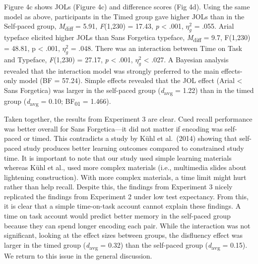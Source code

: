 \documentclass[
  english,
  jou]{apa7}
\begin{document}
Figure 4c shows JOLs (Figure 4c) and difference scores (Fig 4d). Using the same model as above, participants in the Timed group gave higher JOLs than in the Self-paced group, \emph{M}\textsubscript{diff} = 5.91, \emph{F}(1,230) = 17.43, \emph{p} \textless{} .001, \(\eta_{g}^{2}\) = .055. Arial typeface elicited higher JOLs than Sans Forgetica typeface, \emph{M}\textsubscript{diff} = 9.7, F(1,230) = 48.81, p \textless{} .001, \(\eta_{g}^{2}\) = .048. There was an interaction between Time on Task and Typeface, \emph{F}(1,230) = 27.17, \emph{p} \textless{} .001, \(\eta_{g}^{2}\) \textless{} .027. A Bayesian analysis revealed that the interaction model was strongly preferred to the main effects-only model (BF = 57.24). Simple effects revealed that the JOL effect (Arial \textless{} Sans Forgetica) was larger in the self-paced group (\emph{d}\textsubscript{avg} = 1.22) than in the timed group (\emph{d}\textsubscript{avg} = 0.10; BF\textsubscript{01} = 1.466).

Taken together, the results from Experiment 3 are clear. Cued recall performance was better overall for Sans Forgetica---it did not matter if encoding was self-paced or timed. This contradicts a study by Kühl et al.~(2014) showing that self-paced study produces better learning outcomes compared to constrained study time. It is important to note that our study used simple learning materials whereas Kühl et al., used more complex materials (i.e., multimedia slides about lightening construction). With more complex materials, a time limit might hurt rather than help recall. Despite this, the findings from Experiment 3 nicely replicated the findings from Experiment 2 under low test expectancy. From this, it is clear that a simple time-on-task account cannot explain these findings. A time on task account would predict better memory in the self-paced group because they can spend longer encoding each pair. While the interaction was not significant, looking at the effect sizes between groups, the disfluency effect was larger in the timed group (\emph{d}\textsubscript{avg} = 0.32) than the self-paced group (\emph{d}\textsubscript{avg} = 0.15). We return to this issue in the general discussion.
\end{document}
